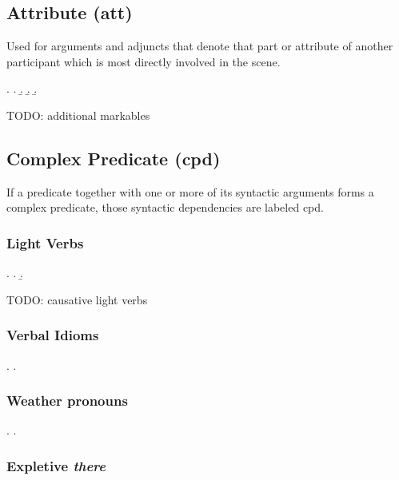 \documentclass[a4paper]{article}
\begin{document}

\subsection{Attribute (\textsf{att})}
\label{sec:att}

Used for arguments and adjuncts that denote that part or attribute of another
participant which is most directly involved in the scene.

\ex.
\a. 
\b. 
\b. 
\b. 

TODO: additional markables


\clearpage
\subsection{Complex Predicate (\textsf{cpd})}
\label{sec:cpd}

If a predicate together with one or more of its syntactic arguments forms a
complex predicate, those syntactic dependencies are labeled \textsf{cpd}.

\subsubsection{Light Verbs}

\ex.
\a. 
\b. 

TODO: causative light verbs

\subsubsection{Verbal Idioms}

\ex.
\a. 

\subsubsection{Weather pronouns}

\ex.
\a. 

\subsubsection{Expletive \emph{there}}
\end{document}
